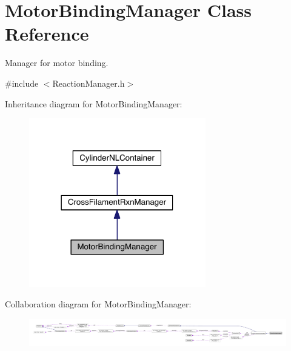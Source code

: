 \hypertarget{classMotorBindingManager}{\section{Motor\+Binding\+Manager Class Reference}
\label{classMotorBindingManager}
}


Manager for motor binding.  




{\ttfamily \#include $<$Reaction\+Manager.\+h$>$}



Inheritance diagram for Motor\+Binding\+Manager\+:\nopagebreak
\begin{figure}[H]
\begin{center}
\leavevmode
\includegraphics[width=218pt]{classMotorBindingManager__inherit__graph}
\end{center}
\end{figure}


Collaboration diagram for Motor\+Binding\+Manager\+:\nopagebreak
\begin{figure}[H]
\begin{center}
\leavevmode
\includegraphics[width=350pt]{classMotorBindingManager__coll__graph}
\end{center}
\end{figure}

